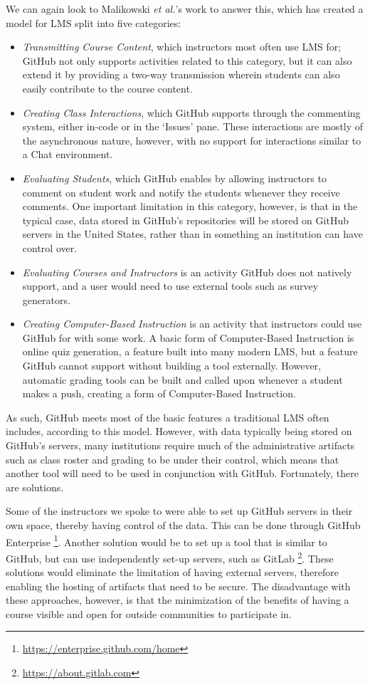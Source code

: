 We can again look to Malikowski \textit{et al.}'s \cite{malikowski2007model} work to answer this, which has created a model for LMS split into five categories: \\
\begin{itemize}
\item \emph{Transmitting Course Content}, which instructors most often use LMS for; GitHub not only supports activities related to this category, but it can also extend it by providing a two-way transmission wherein students can also easily contribute to the course content.
\item \emph{Creating Class Interactions}, which GitHub supports through the commenting system, either in-code or in the `Issues' pane. These interactions are mostly of the asynchronous nature, however, with no support for interactions similar to a Chat environment.
\item \emph{Evaluating Students}, which GitHub enables by allowing instructors to comment on student work and notify the students whenever they receive comments. One important limitation in this category, however, is that in the typical case, data stored in GitHub's repositories will be stored on GitHub servers in the United States, rather than in something an institution can have control over.
\item \emph{Evaluating Courses and Instructors} is an activity GitHub does not natively support, and a user would need to use external tools such as survey generators.
\item \emph{Creating Computer-Based Instruction} is an activity that instructors could use GitHub for with some work. A basic form of Computer-Based Instruction is online quiz generation, a feature built into many modern LMS, but a feature GitHub cannot support without building a tool externally. However, automatic grading tools can be built and called upon whenever a student makes a push, creating a form of Computer-Based Instruction.
\end{itemize}

As such, GitHub meets most of the basic features a traditional LMS often includes, according to this model. However, with data typically being stored on GitHub's servers, many institutions require much of the administrative artifacts such as class roster and grading to be under their control, which means that another tool will need to be used in conjunction with GitHub. Fortunately, there are solutions.

Some of the instructors we spoke to were able to set up GitHub servers in their own space, thereby having control of the data. This can be done through GitHub Enterprise \footnote{\url{https://enterprise.github.com/home}}. Another solution would be to set up a tool that is similar to GitHub, but can use independently set-up servers, such as GitLab \footnote{\url{https://about.gitlab.com}}. These solutions would eliminate the limitation of having external servers, therefore enabling the hosting of artifacts that need to be secure. The disadvantage with these approaches, however, is that the minimization of the benefits of having a course visible and open for outside communities to participate in.

